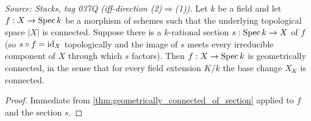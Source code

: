 \begin{lemma}\leanok
  \label{lem:geometricallyConnected_of_connected_of_section}
  \textit{Source: Stacks, tag 037Q (iff-direction (2)\(\Rightarrow\)(1)).}
  Let \(k\) be a field and let \(f : X \to \operatorname{Spec} k\) be a morphism of
  schemes such that the underlying topological space \(|X|\) is
  connected. Suppose there is a \(k\)-rational section \(s : \operatorname{Spec} k \to X\)
  of \(f\) (so \(s \circ f = \operatorname{id}_X\) topologically and the image of \(s\)
  meets every irreducible component of \(X\) through which \(s\) factors).
  Then \(f : X \to \operatorname{Spec} k\) is geometrically connected, in the sense
  that for every field extension \(K/k\) the base change \(X_K\) is
  connected.
\end{lemma}
\begin{proof}
  \leanok
  Immediate from \cref{thm:geometrically_connected_of_section} applied
  to \(f\) and the section \(s\).
\end{proof}


